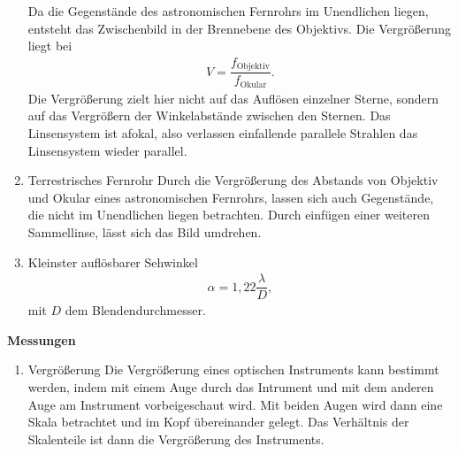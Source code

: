 \begin{enumerate}[label=--]
                Da die Gegenstände des astronomischen Fernrohrs im Unendlichen liegen, entsteht das Zwischenbild in der Brennebene des Objektivs.
                Die Vergrößerung liegt bei
                \begin{align} 
                        V=\dfrac{f_\text{Objektiv}}{f_\text{Okular}}
                .\end{align} 
                Die Vergrößerung zielt hier nicht auf das Auflösen einzelner Sterne, sondern auf das Vergrößern der Winkelabstände zwischen den Sternen.
                Das Linsensystem ist afokal, also verlassen einfallende parallele Strahlen das Linsensystem wieder parallel.
        \item Terrestrisches Fernrohr \hspace{25pt}
                Durch die Vergrößerung des Abstands von Objektiv und Okular eines astronomischen Fernrohrs, lassen sich auch Gegenstände, die nicht im Unendlichen liegen betrachten.
                Durch einfügen einer weiteren Sammellinse, lässt sich das Bild umdrehen.
        \item Kleinster auflösbarer Sehwinkel \hspace{25pt}
                \begin{align} 
                        \alpha =1,22\dfrac{\lambda }{D}
                ,\end{align} 
                mit $D$ dem Blendendurchmesser.
\end{enumerate}
\textbf{Messungen} 
\begin{enumerate}[label=--]
        \item Vergrößerung \hspace{25pt}
                Die Vergrößerung eines optischen Instruments kann bestimmt werden, indem mit einem Auge durch das Intrument und mit dem anderen Auge am Instrument vorbeigeschaut wird.
                Mit beiden Augen wird dann eine Skala betrachtet und im Kopf übereinander gelegt. 
                Das Verhältnis der Skalenteile ist dann die Vergrößerung des Instruments.
\end{enumerate}

\newpage
